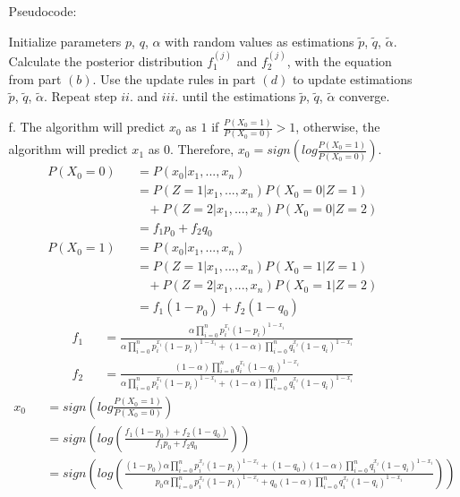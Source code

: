\begin{enumerate}
\begin{enumerate}
		\begin{algorithm}
		\caption{Pseudocode:}\label{euclid}
		\begin{algorithmic}[1]
		\State Initialize parameters $p$, $q$, $\alpha$ with random values as estimations $\tilde{p}$, $\tilde{q}$, $\tilde{\alpha}$.
		\State Calculate the posterior distribution $f_1^{(j)}$ and $f_2^{(j)}$, with the equation from part $(b)$.
		\State Use the update rules in part $(d)$ to update estimations $\tilde{p}$, $\tilde{q}$, $\tilde{\alpha}$.
		\State Repeat step $ii.$ and $iii.$ until the estimations $\tilde{p}$, $\tilde{q}$, $\tilde{\alpha}$ converge.
		\EndProcedure
		\end{algorithmic}
		\end{algorithm}
	\item[f.] The algorithm will predict $x_0$ as $1$ if $\frac{P(X_0 = 1)}{P(X_0 = 0)} > 1$, otherwise, the algorithm will predict $x_1$ as $0$. Therefore, $x_0 = sign(log\frac{P(X_0=1)}{P(X_0=0)})$.
	\begin{eqnarray}
		P(X_0 = 0) && = P(x_0|x_1,...,x_n)\\
		&& = P(Z=1|x_1,...,x_n)P(X_0=0|Z=1)\\
		&& \:\:\:\: + P(Z=2|x_1,...,x_n)P(X_0=0|Z=2)\\
		&& = f_1 p_0 + f_2 q_0\\
		P(X_0 = 1) && = P(x_0|x_1,...,x_n)\\
		&& = P(Z=1|x_1,...,x_n)P(X_0=1|Z=1)\\
		&& \:\:\:\: + P(Z=2|x_1,...,x_n)P(X_0=1|Z=2)\\
		&& = f_1 (1-p_0) + f_2(1-q_0)
	\end{eqnarray}
	\begin{eqnarray}
		f_1 && = \frac{\alpha \prod_{i = 0}^{n} p_i^{x_{i}} (1-p_i)^{1-x_i}}{\alpha \prod_{i = 0}^{n} p_i^{x_{i}} (1-p_i)^{1-x_i} + (1 - \alpha) \prod_{i = 0}^{n} q_i^{x_{i}} (1-q_i)^{1-x_i}}\\
		f_2 && = \frac{(1 - \alpha) \prod_{i = 0}^{n} q_i^{x_{i}} (1-q_i)^{1-x_i}}{\alpha \prod_{i = 0}^{n} p_i^{x_{i}} (1-p_i)^{1-x_i} + (1 - \alpha) \prod_{i = 0}^{n} q_i^{x_{i}} (1-q_i)^{1-x_i}}
	\end{eqnarray}
	\begin{eqnarray}
		x_0 && = sign(log\frac{P(X_0=1)}{P(X_0=0)})\\
		&& = sign(log(\frac{f_1 (1-p_0) + f_2(1-q_0)}{f_1 p_0 + f_2 q_0}))\\
		&& = sign(log(\frac{(1-p_0) \alpha \prod_{i = 0}^{n} p_i^{x_{i}} (1-p_i)^{1-x_i} + (1 - q_0) (1 - \alpha) \prod_{i = 0}^{n} q_i^{x_{i}} (1-q_i)^{1-x_i}}{p_0 \alpha \prod_{i = 0}^{n} p_i^{x_{i}} (1-p_i)^{1-x_i} + q_0 (1 - \alpha) \prod_{i = 0}^{n} q_i^{x_{i}} (1-q_i)^{1-x_i}}))\\

\end{eqnarray}
\end{enumerate}
\end{enumerate}
